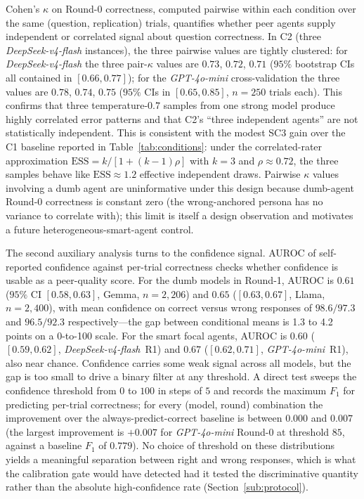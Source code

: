 \documentclass[review,3p,authoryear]{elsarticle}
\begin{document}
Cohen's $\kappa$ on Round-0 correctness, computed pairwise within each
condition over the same (question, replication) trials, quantifies whether
peer agents supply independent or correlated signal about question
correctness.
In C2 (three \textit{DeepSeek-v4-flash} instances), the three pairwise
values are tightly clustered: for \textit{DeepSeek-v4-flash} the three
pair-$\kappa$ values are $0.73$, $0.72$, $0.71$ ($95\%$ bootstrap CIs
all contained in $[0.66, 0.77]$); for the \textit{GPT-4o-mini}
cross-validation the three values are $0.78$, $0.74$, $0.75$
($95\%$ CIs in $[0.65, 0.85]$, $n = 250$ trials each).
This confirms that three temperature-$0.7$ samples from one strong
model produce highly correlated error patterns and that C2's ``three
independent agents'' are not statistically independent.
This is consistent with the modest SC3 gain over the C1 baseline reported
in Table~\ref{tab:conditions}: under the correlated-rater
approximation $\mathrm{ESS} = k / [1 + (k-1)\rho]$ with $k = 3$ and
$\rho \approx 0.72$, the three samples behave like
$\mathrm{ESS} \approx 1.2$ effective independent draws.
Pairwise $\kappa$ values involving a dumb agent are uninformative under
this design because dumb-agent Round-0 correctness is constant zero
(the wrong-anchored persona has no variance to correlate with);
this limit is itself a design observation and motivates a future
heterogeneous-smart-agent control.

The second auxiliary analysis turns to the confidence signal.
AUROC of self-reported confidence against per-trial correctness checks
whether confidence is usable as a peer-quality score.
For the dumb models in Round-1, AUROC is $0.61$ ($95\%$ CI
$[0.58, 0.63]$, Gemma, $n = 2{,}206$) and $0.65$ ($[0.63, 0.67]$,
Llama, $n = 2{,}400$), with mean confidence on correct versus wrong
responses of $98.6/97.3$ and $96.5/92.3$ respectively---the gap between
conditional means is 1.3 to 4.2 points on a 0-to-100 scale.
For the smart focal agents, AUROC is $0.60$ ($[0.59, 0.62]$,
\textit{DeepSeek-v4-flash}~R1) and $0.67$ ($[0.62, 0.71]$,
\textit{GPT-4o-mini}~R1), also near chance.
Confidence carries some weak signal across all models, but the gap
is too small to drive a binary filter at any threshold.
A direct test sweeps the confidence threshold from $0$ to $100$ in
steps of $5$ and records the maximum $F_1$ for predicting per-trial
correctness; for every (model, round) combination the improvement
over the always-predict-correct baseline is between $0.000$ and
$0.007$ (the largest improvement is $+0.007$ for
\textit{GPT-4o-mini} Round-0 at threshold $85$, against a baseline
$F_1$ of $0.779$).
No choice of threshold on these distributions yields a meaningful
separation between right and wrong responses, which is what the
calibration gate would have detected had it tested the discriminative
quantity rather than the absolute high-confidence rate
(Section~\ref{sub:protocol}).
\end{document}
